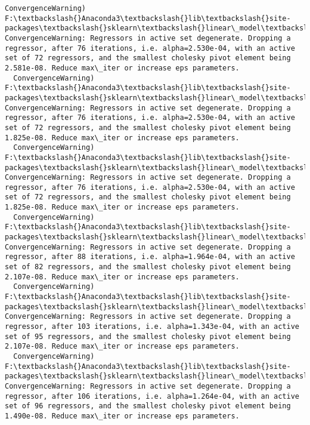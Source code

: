 \documentclass[11pt]{article}
\begin{document}
\begin{Verbatim}[commandchars=\\\{\}]
  ConvergenceWarning)
F:\textbackslash{}Anaconda3\textbackslash{}lib\textbackslash{}site-packages\textbackslash{}sklearn\textbackslash{}linear\_model\textbackslash{}least\_angle.py:313: ConvergenceWarning: Regressors in active set degenerate. Dropping a regressor, after 76 iterations, i.e. alpha=2.530e-04, with an active set of 72 regressors, and the smallest cholesky pivot element being 2.581e-08. Reduce max\_iter or increase eps parameters.
  ConvergenceWarning)
F:\textbackslash{}Anaconda3\textbackslash{}lib\textbackslash{}site-packages\textbackslash{}sklearn\textbackslash{}linear\_model\textbackslash{}least\_angle.py:313: ConvergenceWarning: Regressors in active set degenerate. Dropping a regressor, after 76 iterations, i.e. alpha=2.530e-04, with an active set of 72 regressors, and the smallest cholesky pivot element being 1.825e-08. Reduce max\_iter or increase eps parameters.
  ConvergenceWarning)
F:\textbackslash{}Anaconda3\textbackslash{}lib\textbackslash{}site-packages\textbackslash{}sklearn\textbackslash{}linear\_model\textbackslash{}least\_angle.py:313: ConvergenceWarning: Regressors in active set degenerate. Dropping a regressor, after 76 iterations, i.e. alpha=2.530e-04, with an active set of 72 regressors, and the smallest cholesky pivot element being 1.825e-08. Reduce max\_iter or increase eps parameters.
  ConvergenceWarning)
F:\textbackslash{}Anaconda3\textbackslash{}lib\textbackslash{}site-packages\textbackslash{}sklearn\textbackslash{}linear\_model\textbackslash{}least\_angle.py:313: ConvergenceWarning: Regressors in active set degenerate. Dropping a regressor, after 88 iterations, i.e. alpha=1.964e-04, with an active set of 82 regressors, and the smallest cholesky pivot element being 2.107e-08. Reduce max\_iter or increase eps parameters.
  ConvergenceWarning)
F:\textbackslash{}Anaconda3\textbackslash{}lib\textbackslash{}site-packages\textbackslash{}sklearn\textbackslash{}linear\_model\textbackslash{}least\_angle.py:313: ConvergenceWarning: Regressors in active set degenerate. Dropping a regressor, after 103 iterations, i.e. alpha=1.343e-04, with an active set of 95 regressors, and the smallest cholesky pivot element being 2.107e-08. Reduce max\_iter or increase eps parameters.
  ConvergenceWarning)
F:\textbackslash{}Anaconda3\textbackslash{}lib\textbackslash{}site-packages\textbackslash{}sklearn\textbackslash{}linear\_model\textbackslash{}least\_angle.py:313: ConvergenceWarning: Regressors in active set degenerate. Dropping a regressor, after 106 iterations, i.e. alpha=1.264e-04, with an active set of 96 regressors, and the smallest cholesky pivot element being 1.490e-08. Reduce max\_iter or increase eps parameters.

\end{Verbatim}
\end{document}
